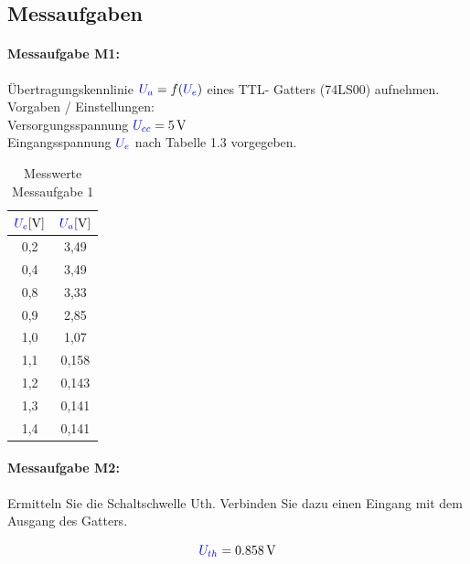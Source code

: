 \documentclass[11pt,a4paper,titlepage]{scrreprt}
\begin{document}
      \subsection{Messaufgaben}
        \paragraph{Messaufgabe M1:} Übertragungskennlinie $\textcolor{blue}{U_a} = f(\textcolor{blue}{U_e})$ eines TTL- Gatters (74LS00) aufnehmen.\\
          Vorgaben / Einstellungen:\\
          Versorgungsspannung $\textcolor{blue}{U_{cc}} = \SI{5}{\volt}$\\
          Eingangsspannung $\textcolor{blue}{U_e}$ nach Tabelle 1.3 vorgegeben.

          \begin{center}
            \begin{table}[!hbtp]
              \caption{Messwerte Messaufgabe 1}
              \renewcommand{\arraystretch}{1.3}
              \begin{center}
                \begin{tabular}{c|c}
                  $\textcolor{blue}{U_e} [\si{\volt}]$ & $\textcolor{blue}{U_a} [\si{\volt}]$ \\ \hline
                  0,2 & 3,49\\
                  0,4 & 3,49\\
                  0,8 & 3,33\\
                  0,9 & 2,85\\
                  1,0 & 1,07\\
                  1,1 & 0,158\\
                  1,2 & 0,143\\
                  1,3 & 0,141\\
                  1,4 & 0,141
                \end{tabular}
              \end{center}
            \end{table}
          \end{center}

        \paragraph{Messaufgabe M2:} Ermitteln Sie die Schaltschwelle Uth. Verbinden Sie dazu einen Eingang mit dem Ausgang des Gatters.

          \begin{equation*}
            \textcolor{blue}{U_{th}} = \SI{0,858}{\volt}
          \end{equation*}
\end{document}
